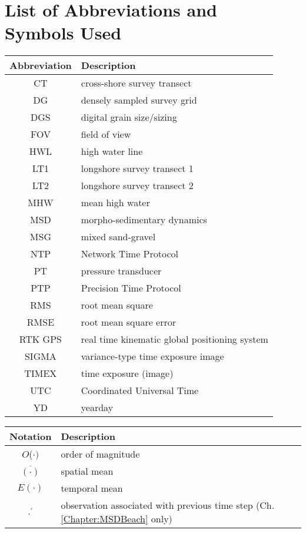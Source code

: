\chapter*{List of Abbreviations and\\ \vspace{-0.5em} Symbols Used}


\setlongtables
\begin{longtable}{cl}
	\hline
	Abbreviation & Description\\
	\hline
	\endhead
	\hline
	\endfoot
	
	CT & cross-shore survey transect\\
	DG & densely sampled survey grid\\
	DGS & digital grain size/sizing\\
	FOV & field of view\\
	HWL & high water line\\
	LT1 & longshore survey transect 1\\
	LT2 & longshore survey transect 2\\
	MHW & mean high water\\
	MSD & morpho-sedimentary dynamics\\
	MSG & mixed sand-gravel\\
	NTP & Network Time Protocol\\
	PT & pressure transducer\\	
	PTP & Precision Time Protocol\\
	RMS & root mean square\\
	RMSE & root mean square error\\
	RTK GPS & real time kinematic global positioning system\\
	SIGMA & variance-type time exposure image\\
	TIMEX & time exposure (image)\\
	UTC & Coordinated Universal Time\\
	YD & yearday\\
	
	\hline
\end{longtable}


\setlongtables
\begin{longtable}{cl}
	\hline
	Notation & Description\\
	\hline
	\endhead
	\hline
	\endfoot
	
	$O$($\cdot)$ & order of magnitude\\
	$\overline{(\cdot)}$ & spatial mean\\
	$E(\cdot)$ & temporal mean\\
	$\cdot^{\prime}$ & observation associated with previous time step (Ch. \ref{Chapter:MSDBeach} only)\\
	
	\hline
\end{longtable}


